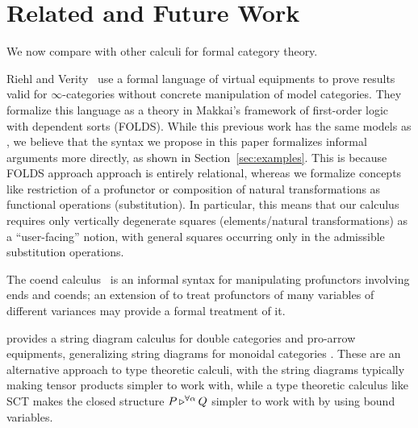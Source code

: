 \documentclass{llncs}
\begin{document}
\section{Related and Future Work}
\label{sec:discussion}

We now compare \vett{} with other calculi for formal category theory.  

Riehl and Verity~\cite{rvXXelements} use a formal language of virtual
equipments to prove results valid for $\infty$-categories without
concrete manipulation of model categories. They formalize this language
as a theory in Makkai's framework of first-order logic with dependent
sorts (FOLDS).  While this previous work has the same models as \vett{},
we believe that the syntax we propose in this paper formalizes informal
arguments more directly, as shown in Section~\ref{sec:examples}.  This
is because FOLDS approach approach is entirely relational, whereas we
formalize concepts like restriction of a profunctor or composition of
natural transformations as functional operations (substitution).  In
particular, this means that our calculus requires only vertically
degenerate squares (elements/natural transformations) as a
``user-facing'' notion, with general squares occurring only in the
admissible substitution operations.


The coend calculus~\citet{coend-calculus} is an informal syntax for
manipulating profunctors involving ends and coends; an extension of
\vett{} to treat profunctors of many variables of different variances
may provide a formal treatment of it.

\citet{djm-string-diagrams} provides a string diagram calculus for
double categories and pro-arrow equipments, generalizing string
diagrams for monoidal categories \citet{joyal?}. These are an
alternative approach to type theoretic calculi, with the string
diagrams typically making tensor products simpler to work with, while
a type theoretic calculus like SCT makes the closed structure
$P \mathop{\triangleright^{\forall \alpha}} Q$ simpler to work with by using bound
variables.
\end{document}
